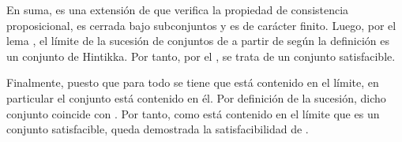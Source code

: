 \begin{isabellebody}
\begin{isamarkuptext}
\begin{demostracion}
    En suma,  es una extensión de  que verifica la propiedad de consistencia proposicional, 
    es cerrada bajo subconjuntos y es de carácter finito. Luego, por el lema , el límite de 
    la sucesión  de conjuntos de  a partir de  según la definición  es un 
    conjunto de Hintikka. Por tanto, por el , se trata de un conjunto 
    satisfacible. 

    Finalmente, puesto que para todo  se tiene que  está contenido en el límite, en 
    particular el conjunto  está contenido en él. Por definición de la sucesión, dicho conjunto 
    coincide con . Por tanto, como  está contenido en el límite que es un conjunto 
    satisfacible, queda demostrada la satisfacibilidad de .
  \end{demostracion}



\end{isamarkuptext}
\end{isabellebody}
